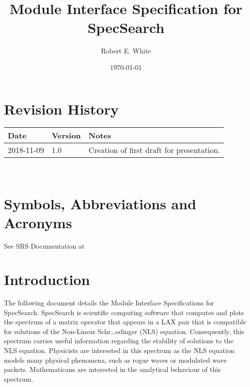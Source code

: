 \documentclass[12pt, titlepage]{article}
\begin{document}
\title{Module Interface Specification for SpecSearch}

\author{Robert E. White}

\date{\today}

\maketitle


\section{Revision History}

\begin{tabularx}{\textwidth}{p{3cm}p{2cm}X}
\toprule {\bf Date} & {\bf Version} & {\bf Notes}\\
\midrule
2018-11-09 & 1.0 & Creation of first draft for presentation. \\
\bottomrule
\end{tabularx}

~\newpage

\section{Symbols, Abbreviations and Acronyms}

See SRS Documentation at 


\newpage

\tableofcontents

\newpage


\section{Introduction}

The following document details the Module Interface Specifications for
SpecSearch. SpecSearch is scientific computing software that computes and plots 
the spectrum of a matrix operator that appears in a LAX pair that is compatible 
for solutions of the Non-Linear Schr\dots{o}dinger (NLS) equation. 
Consequently, this spectrum carries useful information regarding the stability 
of solutions to the NLS equation. Physicists are interested in this spectrum as 
the NLS equation models many physical phenomena, such as rogue waves or 
modulated wave packets. Mathematicans are interested in the analytical 
behaviour of this spectrum. 
\end{document}
